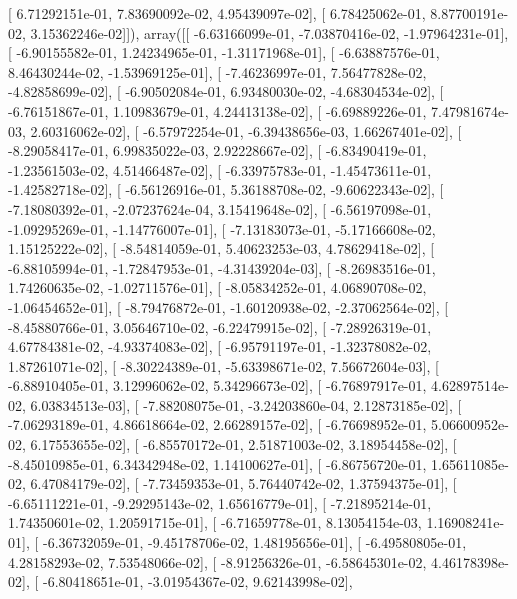 \documentclass{article}
\begin{document}
       [  6.71292151e-01,   7.83690092e-02,   4.95439097e-02],
       [  6.78425062e-01,   8.87700191e-02,   3.15362246e-02]]), array([[ -6.63166099e-01,  -7.03870416e-02,  -1.97964231e-01],
       [ -6.90155582e-01,   1.24234965e-01,  -1.31171968e-01],
       [ -6.63887576e-01,   8.46430244e-02,  -1.53969125e-01],
       [ -7.46236997e-01,   7.56477828e-02,  -4.82858699e-02],
       [ -6.90502084e-01,   6.93480030e-02,  -4.68304534e-02],
       [ -6.76151867e-01,   1.10983679e-01,   4.24413138e-02],
       [ -6.69889226e-01,   7.47981674e-03,   2.60316062e-02],
       [ -6.57972254e-01,  -6.39438656e-03,   1.66267401e-02],
       [ -8.29058417e-01,   6.99835022e-03,   2.92228667e-02],
       [ -6.83490419e-01,  -1.23561503e-02,   4.51466487e-02],
       [ -6.33975783e-01,  -1.45473611e-01,  -1.42582718e-02],
       [ -6.56126916e-01,   5.36188708e-02,  -9.60622343e-02],
       [ -7.18080392e-01,  -2.07237624e-04,   3.15419648e-02],
       [ -6.56197098e-01,  -1.09295269e-01,  -1.14776007e-01],
       [ -7.13183073e-01,  -5.17166608e-02,   1.15125222e-02],
       [ -8.54814059e-01,   5.40623253e-03,   4.78629418e-02],
       [ -6.88105994e-01,  -1.72847953e-01,  -4.31439204e-03],
       [ -8.26983516e-01,   1.74260635e-02,  -1.02711576e-01],
       [ -8.05834252e-01,   4.06890708e-02,  -1.06454652e-01],
       [ -8.79476872e-01,  -1.60120938e-02,  -2.37062564e-02],
       [ -8.45880766e-01,   3.05646710e-02,  -6.22479915e-02],
       [ -7.28926319e-01,   4.67784381e-02,  -4.93374083e-02],
       [ -6.95791197e-01,  -1.32378082e-02,   1.87261071e-02],
       [ -8.30224389e-01,  -5.63398671e-02,   7.56672604e-03],
       [ -6.88910405e-01,   3.12996062e-02,   5.34296673e-02],
       [ -6.76897917e-01,   4.62897514e-02,   6.03834513e-03],
       [ -7.88208075e-01,  -3.24203860e-04,   2.12873185e-02],
       [ -7.06293189e-01,   4.86618664e-02,   2.66289157e-02],
       [ -6.76698952e-01,   5.06600952e-02,   6.17553655e-02],
       [ -6.85570172e-01,   2.51871003e-02,   3.18954458e-02],
       [ -8.45010985e-01,   6.34342948e-02,   1.14100627e-01],
       [ -6.86756720e-01,   1.65611085e-02,   6.47084179e-02],
       [ -7.73459353e-01,   5.76440742e-02,   1.37594375e-01],
       [ -6.65111221e-01,  -9.29295143e-02,   1.65616779e-01],
       [ -7.21895214e-01,   1.74350601e-02,   1.20591715e-01],
       [ -6.71659778e-01,   8.13054154e-03,   1.16908241e-01],
       [ -6.36732059e-01,  -9.45178706e-02,   1.48195656e-01],
       [ -6.49580805e-01,   4.28158293e-02,   7.53548066e-02],
       [ -8.91256326e-01,  -6.58645301e-02,   4.46178398e-02],
       [ -6.80418651e-01,  -3.01954367e-02,   9.62143998e-02],
\end{document}
